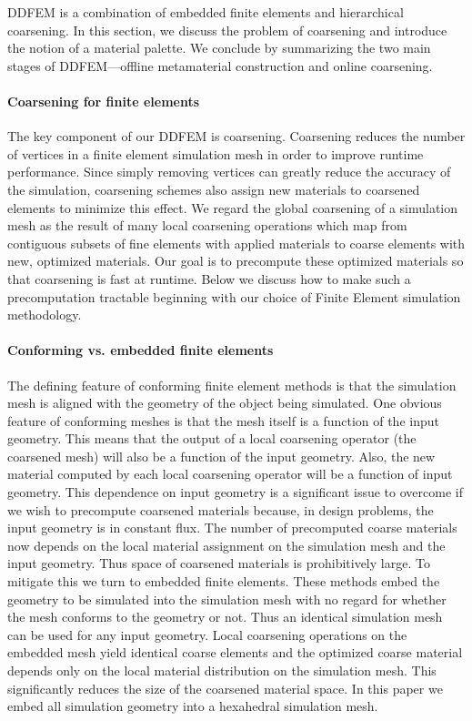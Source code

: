 DDFEM is a combination of embedded finite elements and hierarchical
coarsening.
In this section, we discuss the problem of coarsening
and introduce the notion of a material palette. We conclude by
summarizing the two main stages of DDFEM—offline metamaterial
construction and online coarsening.
\paragraph{Coarsening for finite elements}
The key component of our DDFEM is coarsening.
Coarsening reduces the number of vertices in a finite element simulation mesh in order to improve
runtime performance.
Since simply removing vertices can greatly reduce
the accuracy of the simulation, coarsening schemes also assign
new materials to coarsened elements to minimize this effect.
We regard the global coarsening of a simulation mesh as the result
of many local coarsening operations which map from contiguous
subsets of fine elements with applied materials to coarse elements
with new, optimized materials. Our goal is to precompute these
optimized materials so that coarsening is fast at runtime. Below we
discuss how to make such a precomputation tractable beginning with
our choice of Finite Element simulation methodology.
\paragraph{Conforming vs. embedded finite elements}
The defining feature of conforming finite element methods is that the simulation
mesh is aligned with the geometry of the object being simulated.
One obvious feature of conforming meshes is that the mesh itself is a
function of the input geometry.
This means that the output of a local coarsening operator (the coarsened mesh) will also be a function
of the input geometry.
Also, the new material computed by each local coarsening operator will be a function of input geometry.
This dependence on input geometry is a significant issue to overcome
if we wish to precompute coarsened materials because, in design
problems, the input geometry is in constant flux.
The number of precomputed coarse materials now depends on the local material
assignment on the simulation mesh and the input geometry.
Thus space of coarsened materials is prohibitively large.
To mitigate this we turn to embedded finite elements.
These methods embed the geometry to be simulated into the simulation mesh with no regard
for whether the mesh conforms to the geometry or not.
Thus an identical simulation mesh can be used for any input geometry.
Local coarsening operations on the embedded mesh yield identical coarse
elements and the optimized coarse material depends only on the
local material distribution on the simulation mesh. This significantly
reduces the size of the coarsened material space. In this paper we
embed all simulation geometry into a hexahedral simulation mesh.
